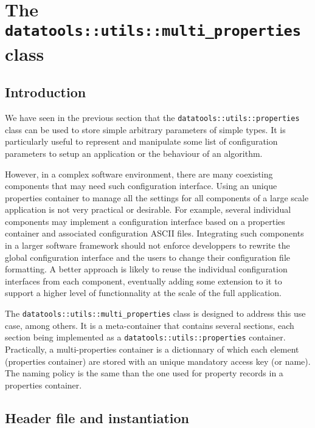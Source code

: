 
\section{The \texttt{datatools::utils::multi\_properties} class}\label{sec:multi_properties}

\subsection{Introduction}

We    have    seen    in     the    previous    section    that    the
\texttt{datatools::utils::properties}  class  can  be  used  to  store
simple arbitrary parameters of simple types. It is particularly useful
to represent  and manipulate some list of  configuration parameters to
setup an application or the behaviour of an algorithm.

\pn However, in a complex  software environment, there are many coexisting
components that may need such configuration interface. Using an unique
properties container to manage all  the settings for all components of
a large  scale application  is not very  practical or  desirable.  For
example, several  individual components may  implement a configuration
interface based on a properties container and associated configuration
ASCII  files.   Integrating  such  components  in  a  larger  software
framework  should  not  enforce  developpers  to  rewrite  the  global
configuration interface  and the  users to change  their configuration
file formatting.  A better approach  is likely to reuse the individual
configuration interfaces  from each component,  eventually adding some
extension to  it to  support a higher  level of functionnality  at the
scale of the full application.

\pn The \texttt{datatools::utils::multi\_properties}  class is designed to
address  this use  case, among  others.  It  is a  meta-container that
contains  several  sections,  each  section  being  implemented  as  a
\texttt{datatools::utils::properties}   container.    Practically,   a
multi-properties  container is  a  dictionnary of  which each  element
(properties container) are stored  with an unique mandatory access key
(or  name).  The  naming policy  is  the same  than the  one used  for
property records in a properties container.


\subsection{Header file and instantiation}

